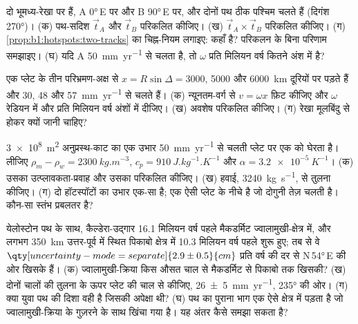 \begin{exercise}[$\star\star$]\label{exo:b1:hotspots:5}
दो  भूमध्य-रेखा पर हैं, A \ang{0}\,E पर और B \ang{90}\,E पर, और दोनों पथ ठीक पश्चिम चलते हैं (दिगंश \ang{270})। (क) पथ-सदिश $\vec t_A$ और $\vec t_B$ परिकलित कीजिए। (ख) $\vec t_A\times\vec t_B$ परिकलित कीजिए। (ग) \cref{prop:b1:hotspots:two-tracks} का चिह्न-नियम लगाइए:  कहाँ है? परिकलन के बिना परिणाम समझाइए। (घ) यदि A \qty{50}{mm.yr^{-1}} से चलता है, तो $\omega$ प्रति मिलियन वर्ष कितने अंश में है?
\end{exercise}

\begin{exercise}[$\star\star$]\label{exo:b1:hotspots:6}
एक प्लेट के तीन  परिभ्रमण-अक्ष से $x = R\sin\Delta = 3000$, 5000 और \qty{6000}{km} दूरियों पर पड़ते हैं और 30, 48 और \qty{57}{mm.yr^{-1}} से चलते हैं। (क) न्यूनतम-वर्ग से $v = \omega x$ फ़िट कीजिए और $\omega$ रेडियन में और प्रति मिलियन वर्ष अंशों में दीजिए। (ख) अवशेष परिकलित कीजिए। (ग) रेखा मूलबिंदु से होकर क्यों जानी चाहिए?
\end{exercise}

\begin{exercise}[$\star\star$]\label{exo:b1:hotspots:7}
\qty{3e8}{m^2} अनुप्रस्थ-काट का एक उभार \qty{50}{mm.yr^{-1}} से चलती प्लेट पर एक  को घेरता है। लीजिए $\rho_m - \rho_w = \qty{2300}{kg.m^{-3}}$, $c_p = \qty{910}{J.kg^{-1}.K^{-1}}$ और $\alpha = \qty{3.2e-5}{K^{-1}}$। (क) उसका उत्प्लावकता-प्रवाह और उसका  परिकलित कीजिए। (ख) हवाई, \qty{3240}{kg.s^{-1}}, से तुलना कीजिए। (ग) दो हॉटस्पॉटों का उभार एक-सा है; एक ऐसी प्लेट के नीचे है जो दोगुनी तेज़ चलती है। कौन-सा स्तंभ प्रबलतर है?
\end{exercise}

\begin{exercise}[$\star\star$]\label{exo:b1:hotspots:8}
येलोस्टोन पथ के साथ, कैल्डेरा-उद्गार 16.1 मिलियन वर्ष पहले मैकडर्मिट ज्वालामुखी-क्षेत्र में, और लगभग \qty{350}{km} उत्तर-पूर्व में स्थित पिकाबो क्षेत्र में 10.3 मिलियन वर्ष पहले शुरू हुए; तब से वे $\qty[uncertainty-mode=separate]{2.9 \pm 0.5}{cm}$ प्रति वर्ष की दर से N\,\ang{54}\,E की ओर खिसके हैं। (क) ज्वालामुखी-क्रिया किस औसत चाल से मैकडर्मिट से पिकाबो तक खिसकी? (ख) दोनों चालों की तुलना  के ऊपर प्लेट की चाल से कीजिए, \qty[uncertainty-mode=separate]{26 \pm 5}{mm.yr^{-1}}, \ang{235} की ओर। (ग) क्या युवा पथ की दिशा वही है जिसकी अपेक्षा थी? (घ) पथ का पुराना भाग एक ऐसे क्षेत्र में पड़ता है जो ज्वालामुखी-क्रिया के गुज़रने के साथ खिंचा गया है। यह अंतर कैसे समझा सकता है?
\end{exercise}

